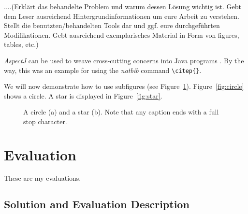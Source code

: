 \documentclass[pdftex,english,oribibl]{llncs}
\begin{document}
....(Erklärt das behandelte Problem und warum dessen Lösung wichtig ist. Gebt dem Leser ausreichend Hintergrundinformationen um eure Arbeit zu verstehen. Stellt die benutzten/behandelten Tools dar und ggf. eure durchgeführten Modifikationen. Gebt ausreichend exemplarisches Material in Form von figures, tables, etc.)

  \textit{AspectJ} can be used to weave cross-cutting concerns into Java programs \citep{AspectJ2007}. By the way, this was an example for using the \textit{natbib} command \texttt{\textbackslash{}citep\{\}}.

  We will now demonstrate how to use subfigures (see Figure~\ref{fig:subfig}). Figure~\ref{fig:circle} shows a circle. A star is displayed in Figure~\ref{fig:star}.

  \begin{figure}
    \centering
    \caption{A circle (a) and a star (b). Note that any caption ends with a full stop character.}
    \label{fig:subfig}
  \end{figure}

\section{Evaluation}\label{sec:evaluation}

  These are my evaluations.
  
  \subsection{Solution and Evaluation Description}
  
\end{document}
